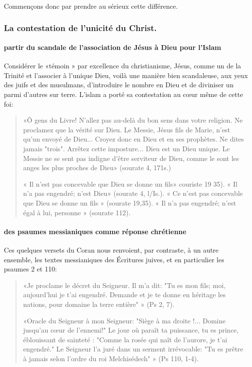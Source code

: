 Commençons donc par prendre au sérieux cette différence.
\subsubsection{La contestation de l'unicité du Christ.}

\paragraph{partir du scandale de l'association de Jésus à Dieu pour l'Islam}
Considérer le «témoin » par excellence du christianisme, Jésus, comme un de la Trinité et l'associer à l'unique Dieu, voilà une manière bien scandaleuse, aux yeux des juifs et des musulmans, d'introduire le nombre en Dieu et de diviniser un parmi d'autres sur terre. L'islam a porté sa contestation au cœur même de cette foi: \begin{quote}
    «Ô gens du Livre! N'allez pas au-delà du bon sens dans votre religion. Ne proclamez que la vérité sur Dieu. Le Messie, Jésus fils de Marie, n'est qu'un envoyé de Dieu... Croyez donc en Dieu et en ses prophètes.
Ne dites jamais "trois". Arrêtez cette imposture... Dieu est un Dieu unique. Le Messie ne se sent pas indigne d'être serviteur de Dieu, comme le sont les anges les plus proches de Dieu» (sourate 4, 171s.)

« Il n'est pas concevable que Dieu se donne un fils» couriste 19 35). « Il n'a pas engendré; n'est Dieu» (sourate 4, l/Is.). « Ce n'est pas concevable que Dieu se donne un fils » (sourate 19,35). « Il n'a pas engendré; n'est égal à lui, personne » (sourate 112).
\end{quote}  
\paragraph{des psaumes messianiques comme réponse chrétienne}
Ces quelques versets du Coran nous renvoient, par contraste, à un autre ensemble, les textes messianiques des Écritures juives, et en particulier les psaumes 2 et 110:
\begin{quote}
    «Je proclame le décret du Seigneur. Il m'a dit: "Tu es mon fils; moi, aujourd'hui je t'ai engendré. Demande et je te donne en héritage les nations, pour domaine la terre entière" » (Ps 2, 7). 
    
    «Oracle du Seigneur à mon Seigneur: "Siège à ma droite !... Domine jusqu'au cœur de l'ennemi!" Le jour où paraît ta puissance, tu es prince, éblouissant de sainteté : "Comme la rosée qui naît de l'aurore, je t'ai engendré." Le Seigneur l'a juré dans un serment irrévocable: "Tu es prêtre à jamais selon l'ordre du roi Melchisédech" » (Ps 110, 1-4). 
\end{quote}
